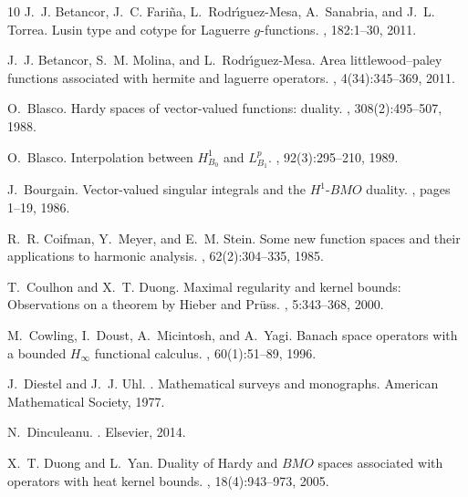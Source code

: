 \documentclass[oneside,english,a4wide]{amsart}
\numberwithin{equation}{section}
\numberwithin{figure}{section}
\theoremstyle{plain}
\theoremstyle{plain}
\theoremstyle{definition}
\theoremstyle{plain}
\theoremstyle{remark}
\theoremstyle{definition}
\theoremstyle{remark}
\theoremstyle{definition}
\newcommand{\8}{+\infty}
\renewcommand{\1}{\mathbbm{1}}
\begin{document}
{\begin{thebibliography}{10}
    J.~J. Betancor, J.~C. Fari{\~n}a, L.~Rodr{\'\i}guez-Mesa, A.~Sanabria, and
      J.~L. Torrea.
    \newblock Lusin type and cotype for {L}aguerre $g$-functions.
    , 182:1--30, 2011.
    
    J.~J. Betancor, S.~M. Molina, and L.~Rodr{\'\i}guez-Mesa.
    \newblock Area littlewood--paley functions associated with hermite and laguerre
      operators.
    , 4(34):345--369, 2011.
    
    O.~Blasco.
    \newblock Hardy spaces of vector-valued functions: duality.
    , 308(2):495--507, 1988.
    
    O.~Blasco.
    \newblock Interpolation between ${H}^1_{B_0}$ and ${L}^p_{B_1}$.
    , 92(3):295--210, 1989.
    
    J.~Bourgain.
    \newblock Vector-valued singular integrals and the ${H}^1$-${BMO}$ duality.
    , pages 1--19, 1986.
    
    R.~R. Coifman, Y.~Meyer, and E.~M. Stein.
    \newblock Some new function spaces and their applications to harmonic analysis.
    , 62(2):304--335, 1985.
    
    T.~Coulhon and X.~T. Duong.
    \newblock Maximal regularity and kernel bounds: Observations on a theorem by
      {H}ieber and {P}r{\"u}ss.
    , 5:343--368, 2000.
    
    M.~Cowling, I.~Doust, A.~Micintosh, and A.~Yagi.
    \newblock Banach space operators with a bounded ${H}_{\infty}$ functional
      calculus.
    , 60(1):51--89, 1996.
    
    J.~Diestel and J.~J. Uhl.
    .
    \newblock Mathematical surveys and monographs. American Mathematical Society,
      1977.
    
    N.~Dinculeanu.
    .
    \newblock Elsevier, 2014.
    
    X.~T. Duong and L.~Yan.
    \newblock Duality of {H}ardy and ${BMO}$ spaces associated with operators with
      heat kernel bounds.
    , 18(4):943--973, 2005.
    

\end{thebibliography}}
\end{document}
